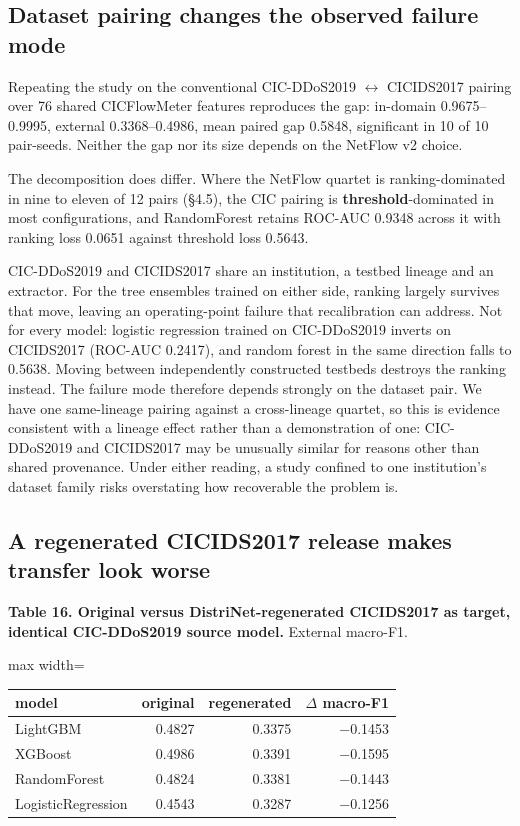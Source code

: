 \documentclass[preprint,12pt,nopreprintline]{elsarticle}
\begin{document}
\subsection{Dataset pairing changes the observed failure mode}

Repeating the study on the conventional CIC-DDoS2019 \ensuremath{\leftrightarrow} CICIDS2017 pairing over 76 shared CICFlowMeter features reproduces the gap: in-domain 0.9675--0.9995, external 0.3368--0.4986, mean paired gap 0.5848, significant in 10 of 10 pair-seeds. Neither the gap nor its size depends on the NetFlow v2 choice.

The decomposition does differ. Where the NetFlow quartet is ranking-dominated in nine to eleven of 12 pairs (\S{}4.5), the CIC pairing is \textbf{threshold}-dominated in most configurations, and RandomForest retains ROC-AUC 0.9348 across it with ranking loss 0.0651 against threshold loss 0.5643.

CIC-DDoS2019 and CICIDS2017 share an institution, a testbed lineage and an extractor. For the tree ensembles trained on either side, ranking largely survives that move, leaving an operating-point failure that recalibration can address. Not for every model: logistic regression trained on CIC-DDoS2019 inverts on CICIDS2017 (ROC-AUC 0.2417), and random forest in the same direction falls to 0.5638. Moving between independently constructed testbeds destroys the ranking instead. The failure mode therefore depends strongly on the dataset pair. We have one same-lineage pairing against a cross-lineage quartet, so this is evidence consistent with a lineage effect rather than a demonstration of one: CIC-DDoS2019 and CICIDS2017 may be unusually similar for reasons other than shared provenance. Under either reading, a study confined to one institution's dataset family risks overstating how recoverable the problem is.

\subsection{A regenerated CICIDS2017 release makes transfer look worse}

\textbf{Table 16. Original versus DistriNet-regenerated CICIDS2017 as target, identical CIC-DDoS2019 source model.} External macro-F1.

\begin{table}[htbp]\centering\scriptsize
\begin{adjustbox}{max width=\textwidth}\begin{tabular}{lrrr}
\toprule
model & original & regenerated & $\Delta$ macro-F1 \\
\midrule
LightGBM & 0.4827 & 0.3375 & $-$0.1453 \\
XGBoost & 0.4986 & 0.3391 & $-$0.1595 \\
RandomForest & 0.4824 & 0.3381 & $-$0.1443 \\
LogisticRegression & 0.4543 & 0.3287 & $-$0.1256 \\
\bottomrule
\end{tabular}\end{adjustbox}
\end{table}
\end{document}
